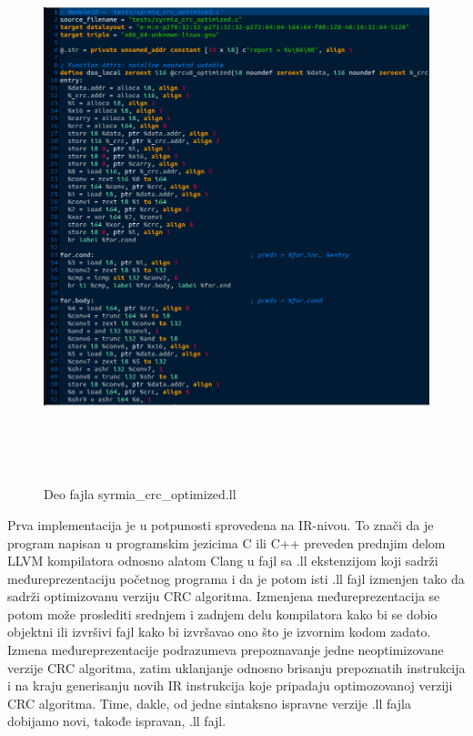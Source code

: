 \documentclass[12pt,oneside]{memoir}
\begin{document}
\begin{figure}
\includegraphics[width=\textwidth, height=16cm]{optimized_ir}
\caption{Deo fajla syrmia\_crc\_optimized.ll}
\centering
\end{figure}

Prva implementacija je u potpunosti sprovedena na IR-nivou. To znači da je 
program napisan u programskim jezicima C ili C++ preveden prednjim delom LLVM 
kompilatora odnosno alatom Clang u fajl sa .ll ekstenzijom koji sadrži 
međureprezentaciju početnog programa i da je potom isti .ll fajl izmenjen tako 
da sadrži optimizovanu verziju CRC algoritma. Izmenjena međureprezentacija se 
potom može proslediti srednjem i zadnjem delu kompilatora kako bi se dobio 
objektni ili izvršivi fajl kako bi izvršavao ono što je izvornim kodom zadato.  
Izmena međureprezentacije podrazumeva prepoznavanje jedne neoptimizovane 
verzije CRC algoritma, zatim uklanjanje odnosno brisanju prepoznatih 
instrukcija i na kraju generisanju novih IR instrukcija koje pripadaju 
optimozovanoj verziji CRC algoritma. Time, dakle, od jedne sintaksno ispravne 
verzije .ll fajla dobijamo novi, takođe ispravan, .ll fajl.
\end{document}
